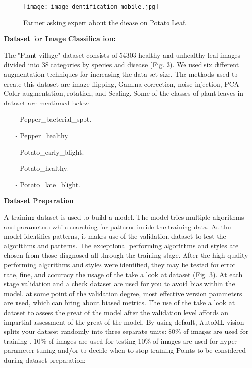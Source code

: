 \documentclass[10pt,conference]{IEEEtran}
\begin{document}
\begin{figure}[h]
 \centering
   \texttt{[image: image\_dentification\_mobile.jpg]}
  \caption{Farmer asking expert about the diease on Potato Leaf. }
\end{figure}


{\raggedright
\textbf{Dataset for Image Classification:}
}


{\raggedright
The "Plant village" dataset consists of 54303 healthy and unhealthy leaf images divided into 38 categories by species and disease (Fig. 3). We used six different augmentation techniques for increasing the data-set size. The methods used to create this dataset are image flipping, Gamma correction, noise injection, PCA Color augmentation, rotation, and Scaling.
Some of the classes of plant leaves in dataset are mentioned below.
}




\begin{itemize}
	\item[-] Pepper\_bacterial\_spot.
	\item[-] Pepper\_healthy.
	\item[-] Potato\_early\_blight.
	\item[-] Potato\_healthy.
	\item[-] Potato\_late\_blight.
\end{itemize}

{\raggedright
\textbf{Dataset Preparation}
}

{\raggedright
A training dataset is used to build a model. The model tries multiple algorithms and parameters while searching for patterns inside the training data. As the model identifies patterns, it makes use of the validation dataset to test the algorithms and patterns. The exceptional performing algorithms and styles are chosen from those diagnosed all through the training stage. After the high-quality performing algorithms and styles were identified, they may be tested for error rate, fine, and accuracy the usage of the take a look at dataset (Fig. 3).
At each stage validation and a check dataset are used for you to avoid bias within the model. at some point of the validation degree, most effective version parameters are used, which can bring about biased metrics. The use of the take a look at dataset to assess the great of the model after the validation level affords an impartial assessment of the great of the model.
By using default, AutoML vision splits your dataset randomly into three separate units:
80\% of images are used for training , 10\% of images are used for testing
10\% of images are used for hyper-parameter tuning and/or to decide when to stop training
Points to be considered during dataset preparation:  
}
\end{document}
